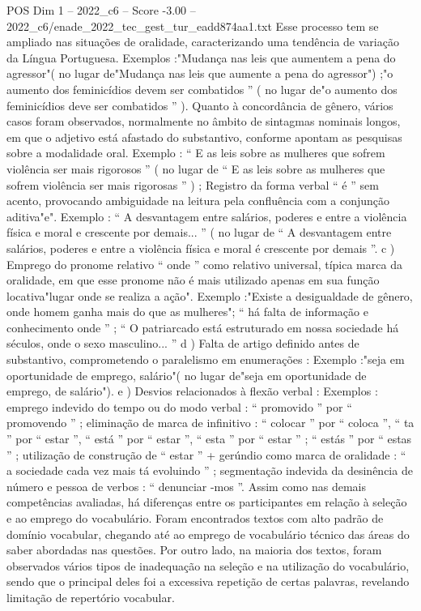 \begin{textsample}{POS Dim 1 – 2022\_c6 – Score -3.00 – 2022\_c6/enade\_2022\_tec\_gest\_tur\_eadd874aa1.txt}
Esse processo tem se ampliado nas situações de oralidade, caracterizando uma tendência de variação da Língua Portuguesa.
Exemplos :"Mudança nas leis que aumentem a pena do agressor"( no lugar de"Mudança nas leis que aumente a pena do agressor") ;"o aumento dos feminicídios devem ser combatidos ” ( no lugar de"o aumento dos feminicídios deve ser combatidos ” ).
Quanto à concordância de gênero, vários casos foram observados, normalmente no âmbito de sintagmas nominais longos, em que o adjetivo está afastado do substantivo, conforme apontam as pesquisas sobre a modalidade oral.
Exemplo : “ E as leis sobre as mulheres que sofrem violência ser mais rigorosos ” ( no lugar de “ E as leis sobre as mulheres que sofrem violência ser mais rigorosas ” ) ; Registro da forma verbal “ é ” sem acento, provocando ambiguidade na leitura pela confluência com a conjunção aditiva"e".
Exemplo : “ A desvantagem entre salários, poderes e entre a violência física e moral e crescente por demais... ” ( no lugar de “ A desvantagem entre salários, poderes e entre a violência física e moral é crescente por demais ”. c ) Emprego do pronome relativo “ onde ” como relativo universal, típica marca da oralidade, em que esse pronome não é mais utilizado apenas em sua função locativa"lugar onde se realiza a ação".
Exemplo :"Existe a desigualdade de gênero, onde homem ganha mais do que as mulheres"; “ há falta de informação e conhecimento onde ” ; “ O patriarcado está estruturado em nossa sociedade há séculos, onde o sexo masculino... ” d ) Falta de artigo definido antes de substantivo, comprometendo o paralelismo em enumerações : Exemplo :"seja em oportunidade de emprego, salário"( no lugar de"seja em oportunidade de emprego, de salário"). e ) Desvios relacionados à flexão verbal : Exemplos : emprego indevido do tempo ou do modo verbal : “ promovido ” por “ promovendo ” ; eliminação de marca de infinitivo : “ colocar ” por “ coloca ”, “ ta ” por “ estar ”, “ está ” por “ estar ”, “ esta ” por “ estar ” ; “ estás ” por “ estas ” ; utilização de construção de “ estar ” + gerúndio como marca de oralidade : “ a sociedade cada vez mais tá evoluindo ” ; segmentação indevida da desinência de número e pessoa de verbos : “ denunciar -mos ”.
Assim como nas demais competências avaliadas, há diferenças entre os participantes em relação à seleção e ao emprego do vocabulário.
Foram encontrados textos com alto padrão de domínio vocabular, chegando até ao emprego de vocabulário técnico das áreas do saber abordadas nas questões.
Por outro lado, na maioria dos textos, foram observados vários tipos de inadequação na seleção e na utilização do vocabulário, sendo que o principal deles foi a excessiva repetição de certas palavras, revelando limitação de repertório vocabular.

\end{textsample}
